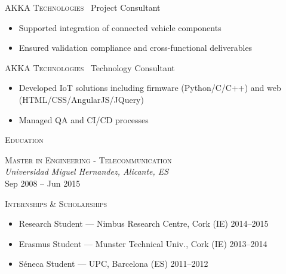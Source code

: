 \documentclass[11pt, a4paper]{article}
\newcommand{\headright}[1]{\vspace*{2ex}\textsc{\large\color{cvblue}#1}\par%
  \vspace*{-1.4ex}{\color{cvblue}\hrulefill}\par}
\newlength{\SideBarW}
\newlength{\TitleBulletGap}     %
\newlength{\BetweenJobsGap}     %
\newenvironment{job}[3]{%
  \vspace{\BetweenJobsGap}%
  \noindent\textsc{#1} \textemdash\ #2\hfill %
  \begin{itemize}[leftmargin=1.6em,label=--,labelsep=0.5em,itemsep=0.45ex,topsep=0.2ex]
}{%
  \end{itemize}%
}
\begin{document}
\begin{minipage}[t]{\dimexpr\textwidth-\SideBarW-3mm\relax}
  \begin{job}{AKKA Technologies}{Project Consultant}{Dec 2017 -- Mar 2019}
    \item Supported integration of connected vehicle components
    \item Ensured validation compliance and cross-functional deliverables
  \end{job}

  \begin{job}{AKKA Technologies}{Technology Consultant}{Oct 2015 -- Dec 2017}
    \item Developed IoT solutions including firmware (Python/C/C++) and web (HTML/CSS/AngularJS/JQuery)
    \item Managed QA and CI/CD processes
  \end{job}

  \headright{Education}
  \noindent\textsc{Master in Engineering - Telecommunication} \\
  \textit{Universidad Miguel Hernandez, Alicante, ES} \\
  Sep 2008 -- Jun 2015

  \headright{Internships \& Scholarships}
  \begin{itemize}[leftmargin=1.2em,label=--,labelsep=0.5em,itemsep=0.4ex,topsep=0.2ex]
    \item Research Student --- Nimbus Research Centre, Cork (IE) \hfill 2014--2015
    \item Erasmus Student --- Munster Technical Univ., Cork (IE) \hfill 2013--2014
    \item Séneca Student --- UPC, Barcelona (ES) \hfill 2011--2012
  \end{itemize}
\end{minipage}
\end{document}

